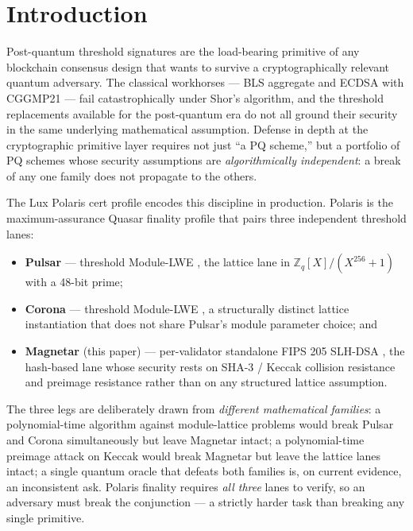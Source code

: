 \section{Introduction}
\label{sec:intro}

Post-quantum threshold signatures are the load-bearing primitive of any
blockchain consensus design that wants to survive a cryptographically
relevant quantum adversary. The classical workhorses --- BLS aggregate
\cite{bls,boneh2001short} and ECDSA with CGGMP21
\cite{cggmp21} --- fail catastrophically under Shor's algorithm, and the
threshold replacements available for the post-quantum era do not all
ground their security in the same underlying mathematical assumption.
Defense in depth at the cryptographic primitive layer requires not just
``a PQ scheme,'' but a portfolio of PQ schemes whose security
assumptions are \emph{algorithmically independent}: a break of any one
family does not propagate to the others.

The Lux Polaris cert profile \cite{lp020} encodes this discipline in
production. Polaris is the maximum-assurance Quasar finality profile
that pairs three independent threshold lanes:
\begin{itemize}[leftmargin=2em,nosep]
  \item \textbf{Pulsar} --- threshold Module-LWE
        \cite{lp073pulsarpaper,ringtail}, the lattice lane in
        $\mathbb{Z}_q[X]/(X^{256}+1)$ with a 48-bit prime;
  \item \textbf{Corona} --- threshold Module-LWE
        \cite{lp104corona,ringtail}, a structurally distinct
        lattice instantiation that does not share Pulsar's module
        parameter choice; and
  \item \textbf{Magnetar} (this paper) --- per-validator standalone
        FIPS 205 SLH-DSA \cite{fips205}, the hash-based lane whose
        security rests on SHA-3 / Keccak collision resistance and
        preimage resistance rather than on any structured lattice
        assumption.
\end{itemize}
The three legs are deliberately drawn from \emph{different mathematical
families}: a polynomial-time algorithm against module-lattice problems
would break Pulsar and Corona simultaneously but leave Magnetar intact;
a polynomial-time preimage attack on Keccak would break Magnetar but
leave the lattice lanes intact; a single quantum oracle that defeats
both families is, on current evidence, an inconsistent ask. Polaris
finality requires \emph{all three} lanes to verify, so an adversary must
break the conjunction --- a strictly harder task than breaking any
single primitive.

